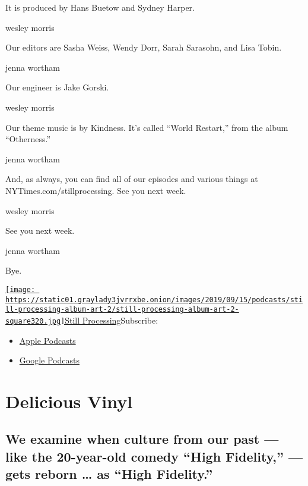 It is produced by Hans Buetow and Sydney Harper.

wesley morris

Our editors are Sasha Weiss, Wendy Dorr, Sarah Sarasohn, and Lisa Tobin.

jenna wortham

Our engineer is Jake Gorski.

wesley morris

Our theme music is by Kindness. It's called ``World Restart,'' from the
album ``Otherness.''

jenna wortham

And, as always, you can find all of our episodes and various things at
NYTimes.com/stillprocessing. See you next week.

wesley morris

See you next week.

jenna wortham

Bye.

\href{https://www.nytimes3xbfgragh.onion/column/still-processing-podcast}{\texttt{[image: https://static01.graylady3jvrrxbe.onion/images/2019/09/15/podcasts/still-processing-album-art-2/still-processing-album-art-2-square320.jpg]}Still
Processing}Subscribe:

\begin{itemize}
\tightlist
\item
  \href{https://itunes.apple.com/us/podcast/id1151436460}{Apple
  Podcasts}
\item
  \href{https://www.google.com/podcasts?feed=aHR0cHM6Ly9yc3MuYXJ0MTkuY29tL255dC1zdGlsbC1wcm9jZXNzaW5n}{Google
  Podcasts}
\end{itemize}

\hypertarget{delicious-vinyl-1}{%
\section{Delicious Vinyl}\label{delicious-vinyl-1}}

\hypertarget{we-examine-when-culture-from-our-past--like-the-20-year-old-comedy-high-fidelity--gets-reborn--as-high-fidelity-1}{%
\subsection{We examine when culture from our past --- like the
20-year-old comedy ``High Fidelity,'' --- gets reborn \ldots{} as ``High
Fidelity.''}\label{we-examine-when-culture-from-our-past--like-the-20-year-old-comedy-high-fidelity--gets-reborn--as-high-fidelity-1}}


